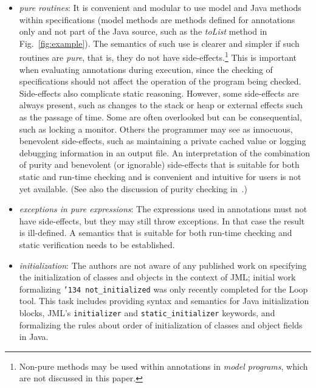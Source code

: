 \documentclass{llncs}
\begin{document}
\begin{itemize}
\setlength{\partopsep}{0in}\setlength{\parskip}{0in}\setlength{\itemsep}{0in}\setlength{\topsep}{0in}
\item \textit{pure routines}: It is convenient and modular to use
  model and Java methods within specifications (model methods are
methods defined for annotations only and not part of the Java source,
such as the {\em toList} method in Fig.~\ref{fig:example}).  The semantics of such
  use is clearer and simpler if such routines are {\em pure}, that is,
  they do not have side-effects.\footnote{Non-pure methods may be used within
annotations in {\em model programs}, which are not discussed in this paper.}
  This is important when evaluating
  annotations during execution, since the checking of specifications
  should not affect the operation of the program being checked.
  Side-effects also complicate static reasoning.  However, some
  side-effects are always present, such as changes to the stack or
  heap or external effects such as the passage of time.  Some are
  often overlooked but can be consequential, such as locking a
  monitor.  Others the programmer may see as innocuous, benevolent
  side-effects, such as maintaining a private cached value or logging
  debugging information in an output file.  An interpretation of the
  combination of purity and benevolent (or ignorable) side-effects
  that is suitable for both static and run-time checking and is
  convenient and intuitive for users is not yet available. (See also
  the discussion of purity checking in~\cite{Leavens-etal03a}.)
\item \textit{exceptions in pure expressions}: The expressions used in
  annotations must not have side-effects, but they may still throw
  exceptions.  In that case the result is ill-defined.  A semantics
  that is suitable for both run-time checking and static verification
  needs to be established.
\item \textit{initialization}: The authors are not aware of any
  published work on specifying the initialization of classes and
  objects in the context of JML; initial work formalizing
  \texttt{\char'134 not\_initialized} was only recently completed for
  the Loop tool.  This task includes providing syntax and semantics
  for Java initialization blocks, JML's \texttt{initializer} and
  \texttt{static\_initializer} keywords, and formalizing the rules
  about order of initialization of classes and object fields in Java.

\end{itemize}
\end{document}
